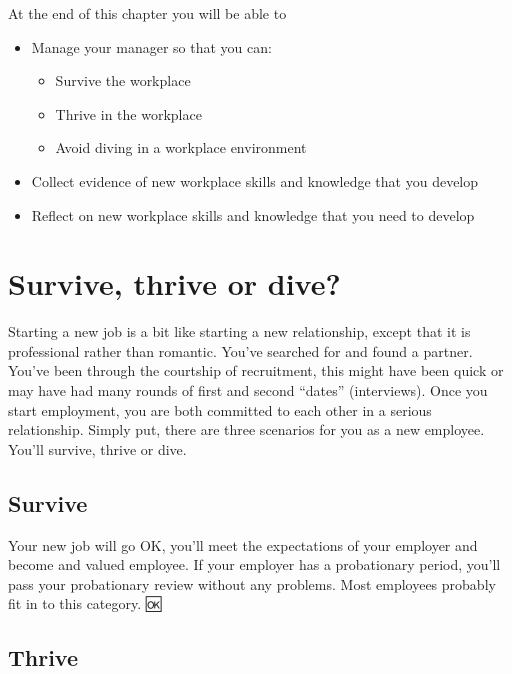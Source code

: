 \documentclass[
]{book}
\providecommand{\tightlist}{%
  \setlength{\itemsep}{0pt}\setlength{\parskip}{0pt}}
\begin{document}
At the end of this chapter you will be able to

\begin{itemize}
\tightlist
\item
  Manage your manager so that you can:

  \begin{itemize}
  \tightlist
  \item
    Survive the workplace
  \item
    Thrive in the workplace
  \item
    Avoid diving in a workplace environment
  \end{itemize}
\item
  Collect evidence of new workplace skills and knowledge that you develop
\item
  Reflect on new workplace skills and knowledge that you need to develop
\end{itemize}

\hypertarget{scenarios}{%
\section{Survive, thrive or dive?}\label{scenarios}}

Starting a new job is a bit like starting a new relationship, except that it is professional rather than romantic. You've searched for and found a partner. You've been through the courtship of recruitment, this might have been quick or may have had many rounds of first and second ``dates'' (interviews). Once you start employment, you are both committed to each other in a serious relationship. Simply put, there are three scenarios for you as a new employee. You'll survive, thrive or dive.

\hypertarget{survive}{%
\subsection{Survive}\label{survive}}

Your new job will go OK, you'll meet the expectations of your employer and become and valued employee. If your employer has a probationary period, you'll pass your probationary review without any problems. Most employees probably fit in to this category. 🆗

\hypertarget{thrive}{%
\subsection{Thrive}\label{thrive}}
\end{document}
